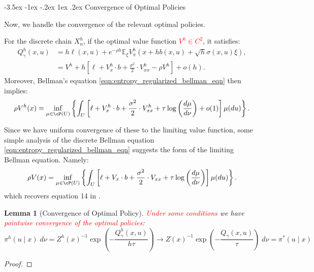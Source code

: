 \documentclass[11pt,oneside,reqno]{article}
\makeatletter
\theoremstyle{plain}
\newtheorem{lemma}[theorem]{Lemma}
\theoremstyle{definition}
\numberwithin{equation}{section}
\def\subsection#1{\@startsection {subsection}{2}{0pt}%
{-3.5ex \@plus -1ex \@minus -.2ex}%
{1ex \@plus.2ex}%
{\bf\mathversion{bold}}{#1}}
\renewcommand{\cite}{\citet}
\newcommand{\E}{\mathbb{E}}
\newcommand{\red}{\textcolor{red}}
\makeatother
\begin{document}
\subsection{Convergence of Optimal Policies}

\noindent Now, we handle the convergence of the relevant optimal policies.

 For the discrete chain $X^h_n$, if  the optimal value function \red{$V^h \in C^2$}, it satisfies:
%
\begin{align*}
	Q^h_\gamma(x,u) & = h \ell(x,u) + e^{-\rho h} \E_\xi V^h_\pi(x + h b(x,u) + \sqrt{h} \sigma(x,u) \xi), \\
					& = V^h + h \left[\ell + V_x^h \cdot b + \frac{\sigma^2}{2} \cdot V_{xx}^h - \rho V^h\right] + o(h).
\end{align*}
%
\noindent Moreover, Bellman's equation \eqref{eqn:entropy_regularized_bellman_eqn} then implies:
%
\[\rho V^h(x) = \inf_{\mu \in \cP(U)} \left\{\int_U \left[\ell + V_x^h \cdot b + \frac{\sigma^2}{2} \cdot V_{xx}^h + \tau \log\left(\frac{d\mu}{d\nu}\right) + o(1)\right] \mu(du)\right\}. \]
%

\noindent Since we have uniform convergence of these to the limiting value function, some simple analysis 
of the discrete Bellman equation \eqref{eqn:entropy_regularized_bellman_eqn} suggests the form of the 
limiting Bellman equation. Namely:
%
\[\rho V(x) = \inf_{\mu \in \cP(U)} \left\{\int_U \left[\ell + V_x\cdot b + \frac{\sigma^2}{2} \cdot V_{xx} + \tau \log\left(\frac{d\mu}{d\nu}\right) \right] \mu(du)\right\}. \]
%
\noindent which recovers equation 14 in \cite{WangZariphopoulouZhou2020}.

\begin{lemma}[Convergence of Optimal Policy]
	\red{Under some conditions} we have \red{pointwise convergence of the optimal policies}:
	\[\pi^h(u \mid x) \; d\nu = Z^h(x)^{-1}\exp\left(-\frac{Q^h_\gamma(x,u)}{h\tau} \right) \to Z(x)^{-1}\exp\left(-\frac{Q_\gamma(x,u)}{\tau} \right) \; d\nu = \pi^*(u \mid x)\]
\end{lemma}

\begin{proof}

\end{proof}
\end{document}
